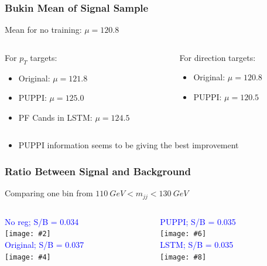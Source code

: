 \documentclass{beamer}
\newcommand{\fourfigs}[8]{
  \begin{columns}
    \begin{column}{0.3\linewidth}
      \centering
      \textcolor{blue}{#1} \\
      \texttt{[image: \#2]} \\
      \textcolor{blue}{#3} \\
      \texttt{[image: \#4]}
    \end{column}
    \begin{column}{0.3\linewidth}
      \centering
      \textcolor{blue}{#5} \\
      \texttt{[image: \#6]} \\
      \textcolor{blue}{#7} \\
      \texttt{[image: \#8]}
    \end{column}
  \end{columns}
}
\begin{document}
\begin{frame}
  \frametitle{Bukin Mean of Signal Sample}

  Mean for no training: $\mu = 120.8$

  \vspace{12pt}

  \begin{columns}
    \begin{column}{0.5\linewidth}
      For $p_T$ targets:
      \begin{itemize}
      \item Original: $\mu = 121.8$
      \item PUPPI: $\mu = 125.0$
      \item PF Cands in LSTM: $\mu = 124.5$
      \end{itemize}
    \end{column}
    \begin{column}{0.5\linewidth}
      For direction targets:
      \begin{itemize}
      \item Original: $\mu = 120.8$
      \item PUPPI: $\mu = 120.5$
        \phantom{\item PF Cands in LSTM: \\ $\mu = 12.22$}
        \phantom{\item PF Cands in LSTM: \\ $\mu = 12.22$}
      \end{itemize}
    \end{column}
  \end{columns}

  \begin{itemize}
  \item PUPPI information seems to be giving the best improvement
  \end{itemize}

\end{frame}


\begin{frame}
  \frametitle{Ratio Between Signal and Background}

  Comparing one bin from $\SI{110}{GeV} < m_{jj} < \SI{130}{GeV}$

  \fourfigs{\scriptsize{No reg; S/B = 0.034}}
           {190813_ratio/signal_hbb_m.pdf}
           {\scriptsize{Original; S/B = 0.037}}
           {190813_ratio/signal_hbb_m_190723_origin.pdf}
           {\scriptsize{PUPPI; S/B = 0.035}}
           {190813_ratio/signal_hbb_m_190723_puppi.pdf}
           {\scriptsize{LSTM; S/B = 0.035}}
           {190813_ratio/signal_hbb_m_190725_lstm_pf.pdf}

\end{frame}
\end{document}
